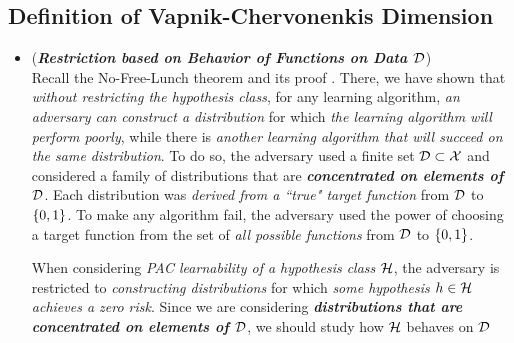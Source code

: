 \documentclass[11pt]{article}
\begin{document}
\subsection{Definition of Vapnik-Chervonenkis Dimension}
\begin{itemize}
\item \begin{remark} (\emph{\textbf{Restriction based on Behavior of Functions on Data ${\mathcal D}$}})\\
Recall the No-Free-Lunch theorem and its proof \citep{shalev2014understanding}. There, we have shown that \emph{without restricting the hypothesis class}, for any learning algorithm, \emph{an adversary can construct a distribution} for which \emph{the learning algorithm will perform poorly}, while there is \emph{another learning algorithm that will succeed on the same distribution}. To do so, the adversary used a finite set ${\mathcal D} \subset {\mathcal X}$ and considered a family of distributions that are
\emph{\textbf{concentrated on elements of ${\mathcal D}$}}. Each distribution was \emph{derived from a ``true" target function} from ${\mathcal D}$ to $\left\{0,1\right\}$. To make any algorithm fail, the adversary used the power of choosing a target function from the set of \emph{all possible functions} from ${\mathcal D}$ to $\left\{0,1\right\}$.

When considering \emph{PAC learnability of a hypothesis class ${\mathcal H}$}, the adversary is restricted to \emph{constructing distributions} for which \emph{some hypothesis $h \in {\mathcal H}$ achieves a zero risk}. Since we are considering \emph{\textbf{distributions that are concentrated on elements of ${\mathcal D}$}}, we should study how ${\mathcal H}$ behaves on ${\mathcal D}$
\end{remark}


\end{itemize}
\end{document}
